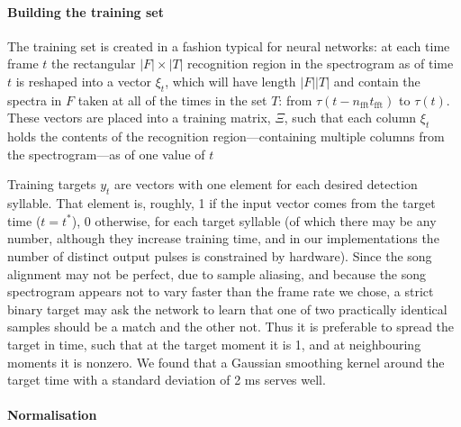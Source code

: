 \documentclass[10pt,letterpaper]{article}
\renewcommand{\subsubsection}[1]{\paragraph{#1}}
\newcommand{\noprint}[1]{}
\begin{document}
\subsubsection{Building the training set}

The training set is created in a fashion typical for neural networks:
at each time frame $t$ the rectangular $|F|\times |T|$ recognition
region in the spectrogram as of time $t$ is reshaped into a vector $\xi_t$, which will
have length $|F||T|$ and contain the spectra in $F$ taken at all of the times in the set $T$: from $\tau(t-n_\textrm{fft}t_\textrm{fft})$ to $\tau(t)$.  These vectors are placed into a training
matrix, $\Xi$, such that each column $\xi_t$ holds the contents of the
recognition region---containing multiple columns from the spectrogram---as of one value of $t$

Training targets $y_t$ are vectors with one element for each desired detection syllable.  That element is, roughly, 1 if the input vector comes from the
target time ($t=t^*$), 0 otherwise, for each target syllable (of which there may be any number, although they increase training time, and in our implementations the number of distinct output pulses is constrained by hardware).  Since the song
alignment may not be perfect, due to sample aliasing, and because the song spectrogram appears not to vary faster than the frame rate we chose, a strict binary target may ask the network to learn that one of two practically identical samples should be a match and the other not. Thus it is preferable to spread the target
in time, such that at the target moment it is 1,
and at neighbouring moments it is nonzero. We found that a Gaussian
smoothing kernel around the target time with a standard deviation of 2 ms serves well.

\noprint{
  With inputs well outside the space on which a neural network has been
trained, its outputs will be essentially random. In order to reduce
the false positive rate it is useful to provide negative training
examples that include silence, cage noise, non-song vocalisations, and
perhaps songs from other birds.  We have found that training with
as low as a 1:1 ratio of non-song to song yields excellent results,
although this will depend on the makeup of the non-song data.
}

\subsubsection{Normalisation}
\end{document}
